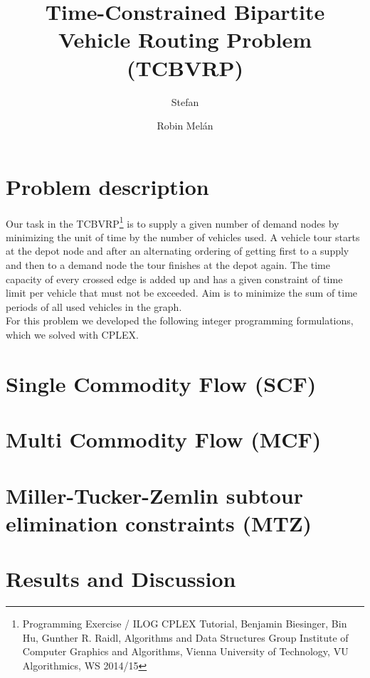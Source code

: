 \documentclass[a4paper]{article}
\begin{document}
\pagestyle{scrheadings}
\ihead{\pagemark} 

\author{Stefan  \and Robin Melán}
\title{Time-Constrained Bipartite Vehicle Routing Problem (TCBVRP)}
\maketitle
\vspace{0.5cm}

\section*{Problem description}
Our task in the TCBVRP\footnote{Programming Exercise / ILOG CPLEX Tutorial, Benjamin Biesinger, Bin Hu, Gunther R. Raidl, Algorithms and Data Structures Group Institute of Computer Graphics and Algorithms, Vienna University of Technology, VU Algorithmics, WS 2014/15} is to supply a given number of demand nodes by minimizing the unit of time by the number of vehicles used. A vehicle tour starts at the depot node and after an alternating ordering of getting first to a supply and then to a demand node the tour finishes at the depot again. The time capacity of every crossed edge is added up and has a given constraint of time limit per vehicle that must not be exceeded. Aim is to minimize the sum of time periods of all used vehicles in the graph.\\
For this problem we developed the following integer programming formulations, which we solved with CPLEX. 

\section*{Single Commodity Flow (SCF)}

\section*{Multi Commodity Flow (MCF)}

\section*{Miller-Tucker-Zemlin subtour elimination constraints (MTZ)}

\section*{Results and Discussion}
\end{document}
